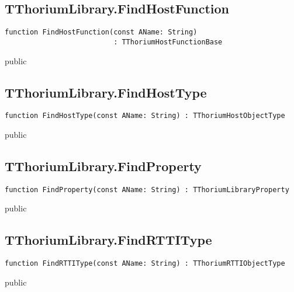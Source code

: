 \subsection{TThoriumLibrary.FindHostFunction}
\label{thoriumcorepkg:thorium:tthoriumlibrary:findhostfunction}
\begin{FPCList}
\Declaration 

\begin{verbatim}
function FindHostFunction(const AName: String)
                          : TThoriumHostFunctionBase
\end{verbatim}
\Visibility
public
\end{FPCList}
\subsection{TThoriumLibrary.FindHostType}
\label{thoriumcorepkg:thorium:tthoriumlibrary:findhosttype}
\begin{FPCList}
\Declaration 

\begin{verbatim}
function FindHostType(const AName: String) : TThoriumHostObjectType
\end{verbatim}
\Visibility
public
\end{FPCList}
\subsection{TThoriumLibrary.FindProperty}
\label{thoriumcorepkg:thorium:tthoriumlibrary:findproperty}
\begin{FPCList}
\Declaration 

\begin{verbatim}
function FindProperty(const AName: String) : TThoriumLibraryProperty
\end{verbatim}
\Visibility
public
\end{FPCList}
\subsection{TThoriumLibrary.FindRTTIType}
\label{thoriumcorepkg:thorium:tthoriumlibrary:findrttitype}
\begin{FPCList}
\Declaration 

\begin{verbatim}
function FindRTTIType(const AName: String) : TThoriumRTTIObjectType
\end{verbatim}
\Visibility
public
\end{FPCList}
